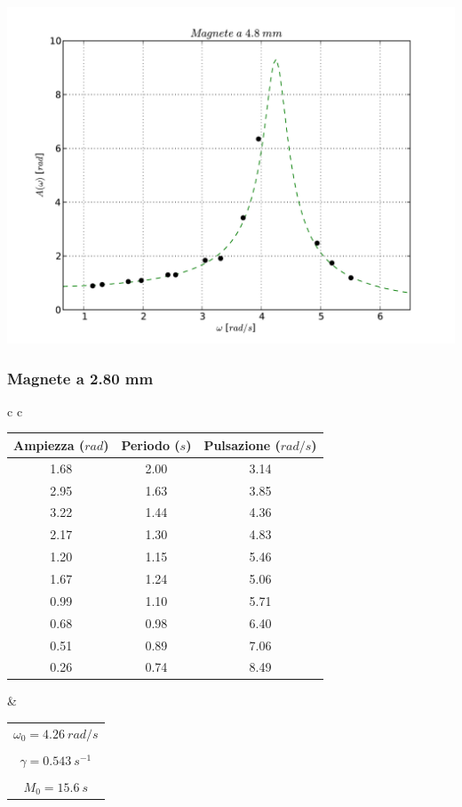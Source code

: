 \begin{center}

\includegraphics[scale=0.75]{"../grafici/Magnetea48mm"}


\end{center}
 
 
\subsubsection{Magnete a 2.80 mm}
\begin{center}

\begin{tabular}{c c}

\begin{tabular}{c | c | c}
\textbf{Ampiezza} ($rad$) & \textbf{Periodo} ($s$) & \textbf{Pulsazione} ($rad/s$)\\
\midrule
1.68 & 2.00 & 3.14\\
2.95 & 1.63 & 3.85\\
3.22 & 1.44 & 4.36\\
2.17 & 1.30 & 4.83\\
1.20 & 1.15 & 5.46\\
1.67 & 1.24 & 5.06\\
0.99 & 1.10 & 5.71\\
0.68 & 0.98 & 6.40\\
0.51 & 0.89 & 7.06\\
0.26 & 0.74 & 8.49\\
\end{tabular}

& \hspace{1cm}

\begin{tabular}{c}
$ \omega_0 = 4.26\ rad/s $\\
\\
$ \gamma = 0.543\ s^{-1} $\\
\\
$ M_0 = 15.6\ s$\\
\end{tabular}

\end{tabular}

\end{center}

